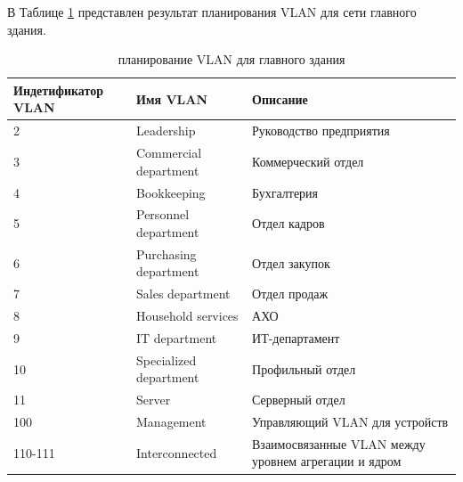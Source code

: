 \documentclass[14pt, a4paper]{extarticle}
\numberwithin{equation}{section}
\begin{document}
В Таблице \ref{table:mainDepVlan} представлен результат планирования VLAN для сети главного здания.
\begin{table}[H]
\centering
\small
\label{table:mainDepVlan}
\caption{планирование VLAN для главного здания}
\begin{tabular}{|l|l|m{6cm}|}
\hline
\textbf{Индетификатор VLAN} & \textbf{Имя VLAN} & \textbf{Описание} \\
\hline
2 & Leadership & Руководство предприятия \\
\hline
3 & Commercial department & Коммерческий отдел \\
\hline
4 & Bookkeeping & Бухгалтерия \\
\hline
5 & Personnel department & Отдел кадров \\
\hline 
6 & Purchasing department & Отдел закупок \\
\hline 
7 & Sales department & Отдел продаж \\
\hline 
8 & Household services & АХО \\
\hline 
9 & IT department & ИТ-департамент \\
\hline
10 & Specialized department & Профильный отдел \\
\hline
11 & Server & Серверный отдел \\
\hline
100 & Management & Управляющий VLAN для устройств \\
\hline
110-111 & Interconnected & Взаимосвязанные VLAN между уровнем агрегации и ядром \\
\hline
\end{tabular}
\end{table}
\end{document}
